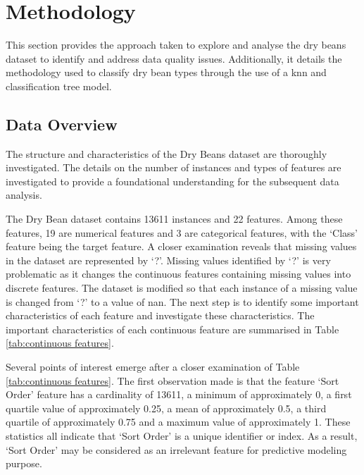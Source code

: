 \documentclass[10pt, conference]{IEEEtran}
\begin{document}
\section{Methodology}

This section provides the approach taken to explore and analyse the dry beans dataset to identify and address data quality
issues. Additionally, it details the methodology used to classify dry bean types through the use of a \acrshort{knn}
and classification tree model.

\subsection{Data Overview} \label{Data_Overview}

The structure and characteristics of the Dry Beans dataset are thoroughly investigated. The details on the number of instances
and types of features are investigated to provide a foundational understanding for the subsequent data analysis.

The Dry Bean dataset contains 13611 instances and 22 features. Among these features, 19 are numerical features and 3 are
categorical features, with the `Class' feature being the target feature. A closer examination reveals that
missing values in the dataset are represented by `?'. Missing values identified by `?' is very problematic as it changes
the continuous features containing missing values into discrete features. The dataset is modified so that each instance
of a missing value is changed from `?' to a value of \acrfull{nan}. The next step is to identify some important
characteristics of each feature and investigate these characteristics. The important characteristics of each
continuous feature are summarised in Table \ref{tab:continuous features}.

Several points of interest emerge after a closer examination of Table \ref{tab:continuous features}. The first
observation made is that the feature `Sort Order' feature has a cardinality of 13611, a minimum of approximately 0,
a first quartile value of approximately 0.25, a mean of approximately 0.5, a third quartile of approximately 0.75 and
a maximum value of approximately 1. These statistics all indicate that `Sort Order' is a unique identifier or index.
As a result, `Sort Order' may be considered as an irrelevant feature for predictive modeling purpose.
\end{document}
